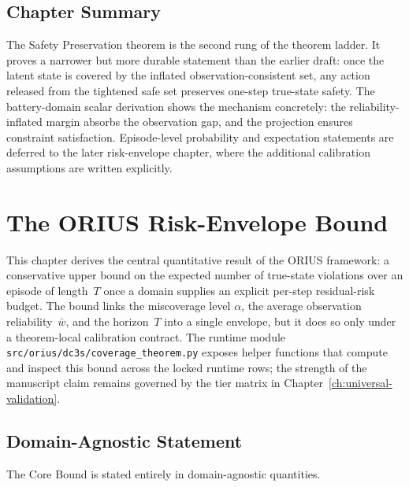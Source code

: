 \subsection{Chapter Summary}

The Safety Preservation theorem is the second rung of the theorem ladder.
It proves a narrower but more durable statement than the earlier draft:
once the latent state is covered by the inflated observation-consistent set,
any action released from the tightened safe set preserves one-step true-state
safety.  The battery-domain scalar derivation shows the mechanism concretely:
the reliability-inflated margin absorbs the observation gap, and the
projection ensures constraint satisfaction.  Episode-level probability and
expectation statements are deferred to the later risk-envelope chapter, where
the additional calibration assumptions are written explicitly.






\section{The ORIUS Risk-Envelope Bound}
\label{ch:core-bound}

This chapter derives the central quantitative result of the ORIUS
framework: a conservative upper bound on the expected number of true-state
violations over an episode of length~$T$ once a domain supplies an explicit
per-step residual-risk budget.  The bound links the miscoverage level
$\alpha$, the average observation reliability~$\bar{w}$, and the horizon~$T$
into a single envelope, but it does so only under a theorem-local
calibration contract.  The runtime module
\texttt{src/orius/dc3s/coverage\_theorem.py} exposes helper functions that
compute and inspect this bound across the locked runtime rows; the
strength of the manuscript claim remains governed by the tier matrix in
Chapter~\ref{ch:universal-validation}.

\subsection{Domain-Agnostic Statement}

The Core Bound is stated entirely in domain-agnostic quantities.

